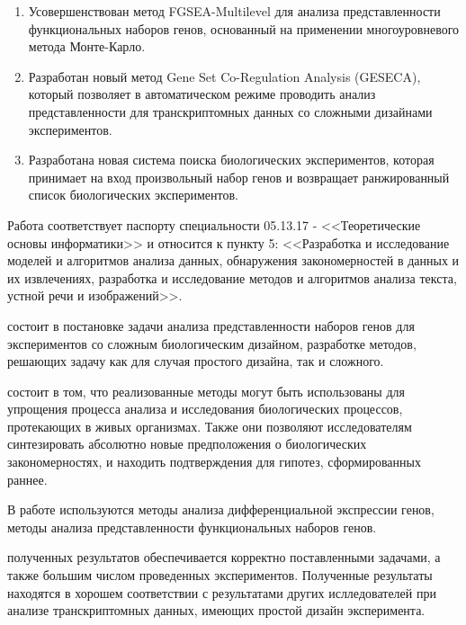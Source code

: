 {}
\begin{enumerate}[beginpenalty=10000] %
  \item Усовершенствован метод FGSEA-Multilevel для анализа представленности функциональных наборов генов, основанный на применении многоуровневого метода Монте-Карло.
  \item Разработан новый метод Gene Set Co-Regulation Analysis (GESECA), который позволяет  в автоматическом режиме проводить анализ представленности для транскриптомных данных со сложными дизайнами экспериментов.
  \item Разработана новая система поиска биологических экспериментов, которая принимает на вход произвольный набор генов и возвращает ранжированный список биологических экспериментов.
\end{enumerate}



{\passport} Работа соответствует паспорту специальности 05.13.17 - <<Теоретические основы информатики>> и относится к пункту 5: <<Разработка и исследование моделей и алгоритмов анализа данных, обнаружения закономерностей в данных и их извлечениях, разработка и исследование методов и алгоритмов анализа текста, устной речи и изображений>>.

{\theorinfluence} состоит в постановке задачи анализа представленности наборов генов для экспериментов со сложным биологическим дизайном, разработке методов, решающих задачу как для случая простого дизайна, так и сложного.

{\influence} состоит в том, что реализованные методы могут быть использованы для упрощения процесса анализа и исследования биологических процессов, протекающих в живых организмах. 
Также они позволяют исследователям синтезировать абсолютно новые предположения о биологических закономерностях, и находить подтверждения для гипотез, сформированных раннее. 

{\methods} В работе используются методы анализа дифференциальной экспрессии генов, методы анализа представленности функциональных наборов генов.



{\reliability} полученных результатов обеспечивается корректно поставленными задачами, а также большим числом проведенных экспериментов.
Полученные результаты находятся в хорошем соответствии с результатами других ислледователей при анализе транскриптомных данных, имеющих простой дизайн эксперимента.

